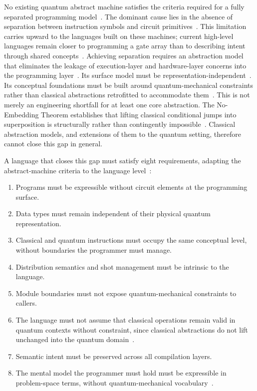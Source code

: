 No existing quantum abstract machine satisfies the criteria required for a fully separated programming model~\cite{nunez_corrales2025betterabstractmachines}.
The dominant cause lies in the absence of separation between instruction symbols and circuit primitives~\cite{nunez_corrales2025betterabstractmachines}.
This limitation carries upward to the languages built on these machines; current high-level languages remain closer to programming a gate array than to describing intent through shared concepts~\cite{DiMatteo2024AbstractionHierarchy}.
Achieving separation requires an abstraction model that eliminates the leakage of execution-layer and hardware-layer concerns into the programming layer~\cite{DiMatteo2024AbstractionHierarchy}.
Its surface model must be representation-independent~\cite{nunez_corrales2025betterabstractmachines}.
Its conceptual foundations must be built around quantum-mechanical constraints rather than classical abstractions retrofitted to accommodate them~\cite{yuan2025foundationalabstractions}.
This is not merely an engineering shortfall for at least one core abstraction.
The No-Embedding Theorem establishes that lifting classical conditional jumps into superposition is structurally rather than contingently impossible~\cite{yuan2025foundationalabstractions}.
Classical abstraction models, and extensions of them to the quantum setting, therefore cannot close this gap in general.

A language that closes this gap must satisfy eight requirements, adapting the abstract-machine criteria to the language level~\cite{nunez_corrales2025betterabstractmachines}:
\begin{enumerate}
    \item Programs must be expressible without circuit elements at the programming surface.
    \item Data types must remain independent of their physical quantum representation.
    \item Classical and quantum instructions must occupy the same conceptual level, without boundaries the programmer must manage.
    \item Distribution semantics and shot management must be intrinsic to the language.
    \item Module boundaries must not expose quantum-mechanical constraints to callers.
    \item The language must not assume that classical operations remain valid in quantum contexts without constraint, since classical abstractions do not lift unchanged into the quantum domain~\cite{yuan2025foundationalabstractions}.
    \item Semantic intent must be preserved across all compilation layers.
    \item The mental model the programmer must hold must be expressible in problem-space terms, without quantum-mechanical vocabulary~\cite{DiMatteo2024AbstractionHierarchy}.
\end{enumerate}